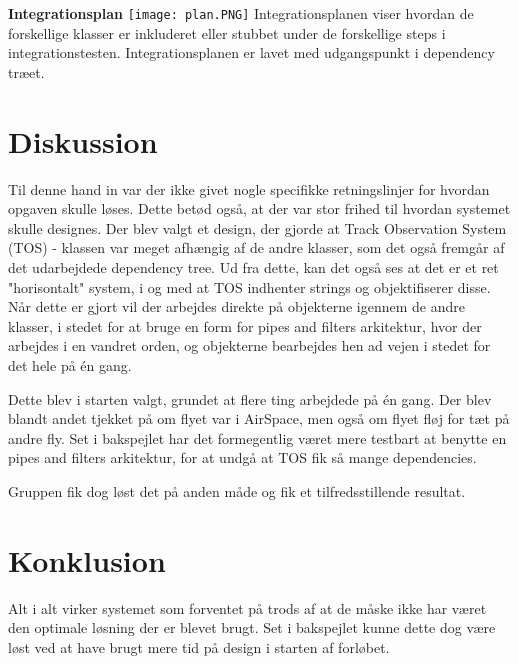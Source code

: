 \textbf{Integrationsplan} \newline
\texttt{[image: plan.PNG]} \newline
Integrationsplanen viser hvordan de forskellige klasser er inkluderet eller stubbet under de forskellige steps i integrationstesten. Integrationsplanen er lavet med udgangspunkt i dependency træet.

\section{Diskussion}
Til denne hand in var der ikke givet nogle specifikke retningslinjer for hvordan opgaven skulle løses. Dette betød også, at der var stor frihed til hvordan systemet skulle designes. \tabularnewline
Der blev valgt et design, der gjorde at Track Observation System (TOS) - klassen var meget afhængig af de andre klasser, som det også fremgår af det udarbejdede dependency tree. 
Ud fra dette, kan det også ses at det er et ret "horisontalt" system, i og med at TOS indhenter strings og objektifiserer disse. 
Når dette er gjort vil der arbejdes direkte på objekterne igennem de andre klasser, i stedet for at bruge en form for pipes and filters arkitektur, hvor der arbejdes i en vandret orden, og objekterne bearbejdes hen ad vejen i stedet for det hele på én gang. 

Dette blev i starten valgt, grundet at flere ting arbejdede på én gang. Der blev blandt andet tjekket på om flyet var i AirSpace, men også om flyet fløj for tæt på andre fly. \tabularnewline
Set i bakspejlet har det formegentlig været mere testbart at benytte en pipes and filters arkitektur, for at undgå at TOS fik så mange dependencies.

Gruppen fik dog løst det på anden måde og fik et tilfredsstillende resultat.

\section{Konklusion}
Alt i alt virker systemet som forventet på trods af at de måske ikke har været den optimale løsning der er blevet brugt. \tabularnewline
Set i bakspejlet kunne dette dog være løst ved at have brugt mere tid på design i starten af forløbet. 